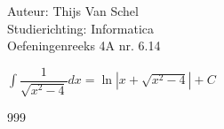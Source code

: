 \documentclass[a4paper]{article}
\newcommand{\dint}{\displaystyle\int}
\begin{document}
  
\noindent \large Auteur: Thijs Van Schel \\
\noindent \large Studierichting: Informatica\\
\noindent \large Oefeningenreeks 4A nr. 6.14\\

\medskip

\normalsize

$\dint\dfrac{1}{\sqrt{x^2-4}}dx = \ln |x+\sqrt{x^2-4}| + C$

\begin{thebibliography}{999}
\end{thebibliography}
\end{document}
